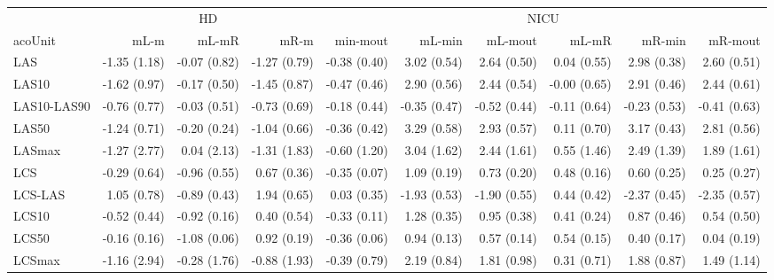 \begin{table}
\fontsize{12.0pt}{14.4pt}\selectfont
\begin{tabular*}{\linewidth}{@{\extracolsep{\fill}}lrrrrrrrrr}
\toprule
 & \multicolumn{3}{c}{HD} & \multicolumn{6}{c}{NICU} \\ 
\cmidrule(lr){2-4} \cmidrule(lr){5-10}
acoUnit & mL-m & mL-mR & mR-m & min-mout & mL-min & mL-mout & mL-mR & mR-min & mR-mout \\ 
\midrule\addlinespace[2.5pt]
LAS & -1.35 (1.18) & -0.07 (0.82) & -1.27 (0.79) & -0.38 (0.40) & 3.02 (0.54) & 2.64 (0.50) & 0.04 (0.55) & 2.98 (0.38) & 2.60 (0.51) \\ 
LAS10 & -1.62 (0.97) & -0.17 (0.50) & -1.45 (0.87) & -0.47 (0.46) & 2.90 (0.56) & 2.44 (0.54) & -0.00 (0.65) & 2.91 (0.46) & 2.44 (0.61) \\ 
LAS10-LAS90 & -0.76 (0.77) & -0.03 (0.51) & -0.73 (0.69) & -0.18 (0.44) & -0.35 (0.47) & -0.52 (0.44) & -0.11 (0.64) & -0.23 (0.53) & -0.41 (0.63) \\ 
LAS50 & -1.24 (0.71) & -0.20 (0.24) & -1.04 (0.66) & -0.36 (0.42) & 3.29 (0.58) & 2.93 (0.57) & 0.11 (0.70) & 3.17 (0.43) & 2.81 (0.56) \\ 
LASmax & -1.27 (2.77) & 0.04 (2.13) & -1.31 (1.83) & -0.60 (1.20) & 3.04 (1.62) & 2.44 (1.61) & 0.55 (1.46) & 2.49 (1.39) & 1.89 (1.61) \\ 
LCS & -0.29 (0.64) & -0.96 (0.55) & 0.67 (0.36) & -0.35 (0.07) & 1.09 (0.19) & 0.73 (0.20) & 0.48 (0.16) & 0.60 (0.25) & 0.25 (0.27) \\ 
LCS-LAS & 1.05 (0.78) & -0.89 (0.43) & 1.94 (0.65) & 0.03 (0.35) & -1.93 (0.53) & -1.90 (0.55) & 0.44 (0.42) & -2.37 (0.45) & -2.35 (0.57) \\ 
LCS10 & -0.52 (0.44) & -0.92 (0.16) & 0.40 (0.54) & -0.33 (0.11) & 1.28 (0.35) & 0.95 (0.38) & 0.41 (0.24) & 0.87 (0.46) & 0.54 (0.50) \\ 
LCS50 & -0.16 (0.16) & -1.08 (0.06) & 0.92 (0.19) & -0.36 (0.06) & 0.94 (0.13) & 0.57 (0.14) & 0.54 (0.15) & 0.40 (0.17) & 0.04 (0.19) \\ 
LCSmax & -1.16 (2.94) & -0.28 (1.76) & -0.88 (1.93) & -0.39 (0.79) & 2.19 (0.84) & 1.81 (0.98) & 0.31 (0.71) & 1.88 (0.87) & 1.49 (1.14) \\ 
\bottomrule
\end{tabular*}
\end{table}

